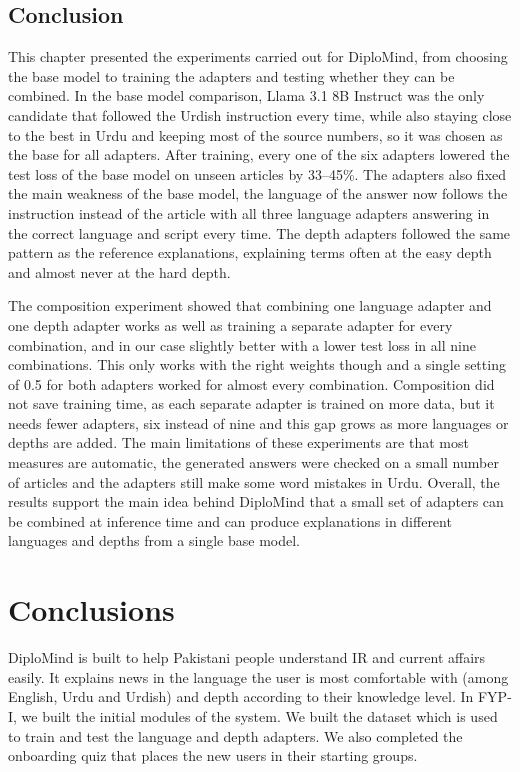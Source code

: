\documentclass{FastFyp}
\begin{document}
\section{Conclusion}
This chapter presented the experiments carried out for DiploMind, from choosing the base model to training the adapters and testing whether they can be combined. In the base model comparison, Llama 3.1 8B Instruct was the only candidate that followed the Urdish instruction every time, while also staying close to the best in Urdu and keeping most of the source numbers, so it was chosen as the base for all adapters. After training, every one of the six adapters lowered the test loss of the base model on unseen articles by 33--45\%. The adapters also fixed the main weakness of the base model, the language of the answer now follows the instruction instead of the article with all three language adapters answering in the correct language and script every time. The depth adapters followed the same pattern as the reference explanations, explaining terms often at the easy depth and almost never at the hard depth.

The composition experiment showed that combining one language adapter and one depth adapter works as well as training a separate adapter for every combination, and in our case slightly better with a lower test loss in all nine combinations. This only works with the right weights though and a single setting of 0.5 for both adapters worked for almost every combination. Composition did not save training time, as each separate adapter is trained on more data, but it needs fewer adapters, six instead of nine and this gap grows as more languages or depths are added. The main limitations of these experiments are that most measures are automatic, the generated answers were checked on a small number of articles and the adapters still make some word mistakes in Urdu. Overall, the results support the main idea behind DiploMind that a small set of adapters can be combined at inference time and can produce explanations in different languages and depths from a single base model.



\chapter{Conclusions}

DiploMind is built to help Pakistani people understand IR and current affairs easily. It explains news in the language the user is most comfortable with (among English, Urdu and Urdish) and depth according to their knowledge level. In FYP-I, we built the initial modules of the system. We built the dataset which is used to train and test the language and depth adapters. We also completed the onboarding quiz that places the new users in their starting groups.
\end{document}
